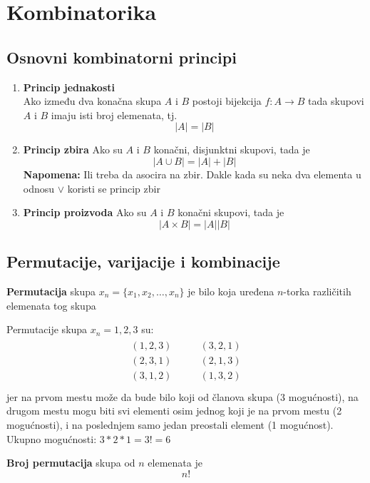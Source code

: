 \section{Kombinatorika}
\subsection{Osnovni kombinatorni principi}
\begin{enumerate}[label=\textbf{\arabic*.)}]
	\item \textbf{Princip jednakosti}\\
		Ako između dva konačna skupa $A$ i $B$ postoji bijekcija $f:A\to B$ tada skupovi $A$ i $B$ imaju isti broj elemenata, tj. $$|A|=|B|$$
	\item \textbf{Princip zbira}
		Ako su $A$ i $B$ konačni, disjunktni skupovi, tada je $$|A\cup B|=|A|+|B|$$
		\textbf{Napomena:} Ili treba da asocira na zbir. Dakle kada su neka dva elementa u odnosu $\lor$ koristi se princip zbir
	\item \textbf{Princip proizvoda}
		Ako su $A$ i $B$ konačni skupovi, tada je $$|A\times B|=|A||B|$$
\end{enumerate}

\subsection{Permutacije, varijacije i kombinacije}
\begin{definition}
	\textbf{Permutacija} skupa $x_n = \{x_1, x_2, \ldots, x_n\}$ je bilo koja uređena $n$-torka različitih elemenata tog skupa
\end{definition}
\begin{example}
	Permutacije skupa $x_n = {1, 2, 3}$ su:
	\begin{align*}
		\begin{aligned}
		(1,2,3)\\
		(2,3,1)\\
		(3,1,2)\\
		\end{aligned}
		\quad \quad
		\begin{aligned}
		(3,2,1)\\
		(2,1,3)\\
		(1,3,2)\\
		\end{aligned}
	\end{align*}
	jer na prvom mestu može da bude bilo koji od članova skupa (3 mogućnosti), na drugom mestu mogu biti svi elementi osim jednog koji je na prvom mestu (2 mogućnosti), i na poslednjem samo jedan preostali element (1 mogućnost).\\
	Ukupno mogućnosti: $3*2*1=3!=6$	
\end{example}
\begin{theorem}
	\textbf{Broj permutacija} skupa od $n$ elemenata je $$n!$$
\end{theorem}

